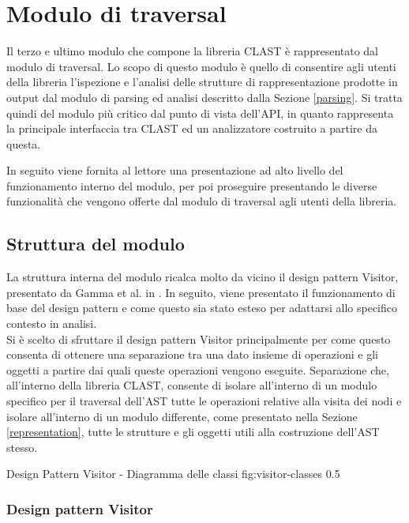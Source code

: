 \section{Modulo di traversal}
\label{traversal}

Il terzo e ultimo modulo che compone la libreria CLAST è rappresentato dal
modulo di traversal. Lo scopo di questo modulo è quello di consentire agli
utenti della libreria l'ispezione e l'analisi delle strutture di
rappresentazione prodotte in output dal modulo di parsing ed analisi descritto
dalla Sezione \ref{parsing}. Si tratta quindi del modulo più critico dal punto
di vista dell'API, in quanto rappresenta la principale interfaccia tra CLAST ed
un analizzatore costruito a partire da questa.

In seguito viene fornita al lettore una presentazione ad alto livello del
funzionamento interno del modulo, per poi proseguire presentando le diverse
funzionalità che vengono offerte dal modulo di traversal agli utenti della
libreria.\\

\subsection{Struttura del modulo}

La struttura interna del modulo ricalca molto da vicino il design pattern
Visitor, presentato da Gamma et al. in \cite{gamma1995design}. In seguito, viene
presentato il funzionamento di base del design pattern e come questo sia stato
esteso per adattarsi allo specifico contesto in analisi.\\

Si è scelto di sfruttare il design pattern Visitor principalmente per come
questo consenta di ottenere una separazione tra una dato insieme di operazioni e
gli oggetti a partire dai quali queste operazioni vengono eseguite. Separazione
che, all'interno della libreria CLAST, consente di isolare all'interno di un
modulo specifico per il traversal dell'AST tutte le operazioni relative alla
visita dei nodi e isolare all'interno di un modulo differente, come presentato
nella Sezione \ref{representation}, tutte le strutture e gli oggetti utili alla
costruzione dell'AST stesso.

      {Design Pattern Visitor - Diagramma delle classi}
      {fig:visitor-classes}
      {0.5}

\subsubsection{Design pattern Visitor}

